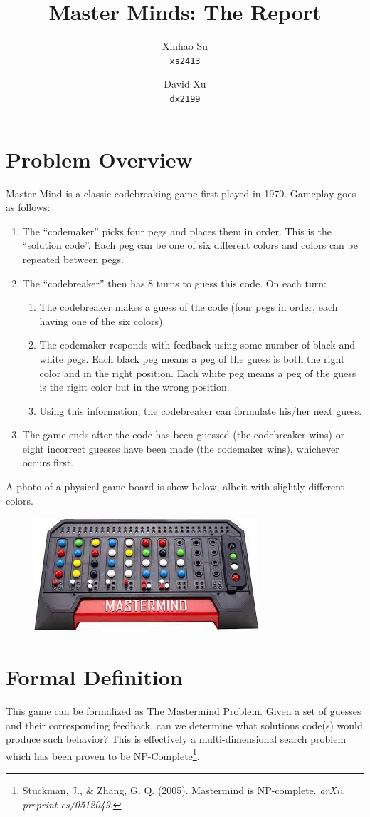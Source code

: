 \documentclass{article}
\title{Master Minds: The Report}
\author{
	Xinhao Su\\
	\texttt{xs2413}
	\and
	David Xu\\
	\texttt{dx2199}
}
\begin{document}
\maketitle
\section{Problem Overview}
Master Mind is a classic codebreaking game first played in 1970. Gameplay goes as follows:
\begin{enumerate}
	\item The ``codemaker'' picks four pegs and places them in order. This is the ``solution code''. Each peg can be one of six different colors and colors can be repeated between pegs.
	\item The ``codebreaker'' then has 8 turns to guess this code. On each turn:
	\begin {enumerate}
		\item The codebreaker makes a guess of the code (four pegs in order, each having one of the six colors).
		\item The codemaker responds with feedback using some number of black and white pegs. Each black peg means a peg of the guess is both the right color and in the right position. Each white peg means a peg of the guess is the right color but in the wrong position.
		\item Using this information, the codebreaker can formulate his/her next guess.
	\end{enumerate}
	\item The game ends after the code has been guessed (the codebreaker wins) or eight incorrect guesses have been made (the codemaker wins), whichever occurs first.
\end{enumerate}

A photo of a physical game board is show below, albeit with slightly different colors.
\begin{figure}[h]
	\centering
	\includegraphics{mm.jpeg}
\end{figure}


\section{Formal Definition}
This game can be formalized as The Mastermind Problem. Given a set of guesses and their corresponding feedback, can we determine what solutions code(s) would produce such behavior? This is effectively a multi-dimensional search problem which has been proven to be NP-Complete\footnote{Stuckman, J., \& Zhang, G. Q. (2005). Mastermind is NP-complete. \textit{arXiv preprint cs/0512049}.}.
\end{document}

